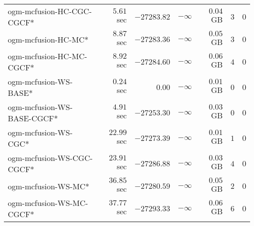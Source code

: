 \begin{table}[H]
\begin{tabular}{lrrrrrr}
ogm-mcfusion-HC-CGC-CGCF* & $         5.61$ sec & $    -27283.82$ & $-\infty$ & $         0.04$ GB & $       3$ & $       0$ \\ 
 ogm-mcfusion-HC-MC* & $         8.87$ sec & $    -27283.36$ & $-\infty$ & $         0.05$ GB & $       3$ & $       0$ \\ 
ogm-mcfusion-HC-MC-CGCF* & $         8.92$ sec & $    -27284.60$ & $-\infty$ & $         0.06$ GB & $       4$ & $       0$ \\ 
ogm-mcfusion-WS-BASE* & $         0.24$ sec & $         0.00$ & $-\infty$ & $         0.01$ GB & $       0$ & $       0$ \\ 
ogm-mcfusion-WS-BASE-CGCF* & $         4.91$ sec & $    -27253.30$ & $-\infty$ & $         0.03$ GB & $       0$ & $       0$ \\ 
ogm-mcfusion-WS-CGC* & $        22.99$ sec & $    -27273.39$ & $-\infty$ & $         0.01$ GB & $       1$ & $       0$ \\ 
ogm-mcfusion-WS-CGC-CGCF* & $        23.91$ sec & $    -27286.88$ & $-\infty$ & $         0.03$ GB & $       4$ & $       0$ \\ 
 ogm-mcfusion-WS-MC* & $        36.85$ sec & $    -27280.59$ & $-\infty$ & $         0.05$ GB & $       2$ & $       0$ \\ 
ogm-mcfusion-WS-MC-CGCF* & $        37.77$ sec & $    -27293.33$ & $-\infty$ & $         0.06$ GB & $       6$ & $       0$ \\ 
\bottomrule
\end{tabular}
\end{table}